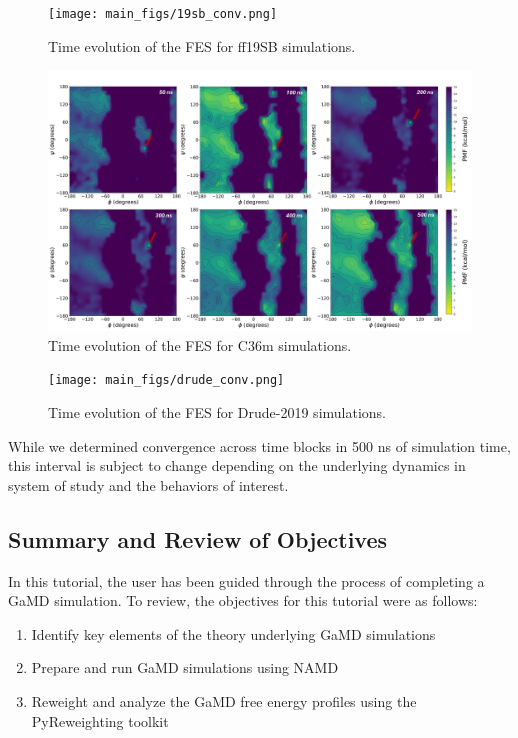 \documentclass[9pt,tutorial]{livecoms}
\begin{document}
\begin{figure}
    \texttt{[image: main\_figs/19sb\_conv.png]}
    \caption{Time evolution of the FES for ff19SB simulations.}
    \label{fig:19sb_conv}
\end{figure}

\begin{figure}
    \includegraphics[scale=0.62]{main_figs/c36_conv.png}
    \caption{Time evolution of the FES for C36m simulations.}
    \label{fig:c36_conv}
\end{figure}

\begin{figure}[h]
    \texttt{[image: main\_figs/drude\_conv.png]}
    \caption{Time evolution of the FES for Drude-2019 simulations.}
    \label{fig:drude_conv}
\end{figure}

While we determined convergence across time blocks in 500 ns of simulation time, this interval is subject to change depending on the underlying dynamics in system of study and the behaviors of interest.

\subsection{Summary and Review of Objectives}
In this tutorial, the user has been guided through the process of completing a GaMD simulation. To review, the objectives for this tutorial were as follows: 

\begin{enumerate}
    \item Identify key elements of the theory underlying GaMD simulations
    \item Prepare and run GaMD simulations using NAMD
    \item Reweight and analyze the GaMD free energy profiles using the PyReweighting toolkit
\end{enumerate}
\end{document}
